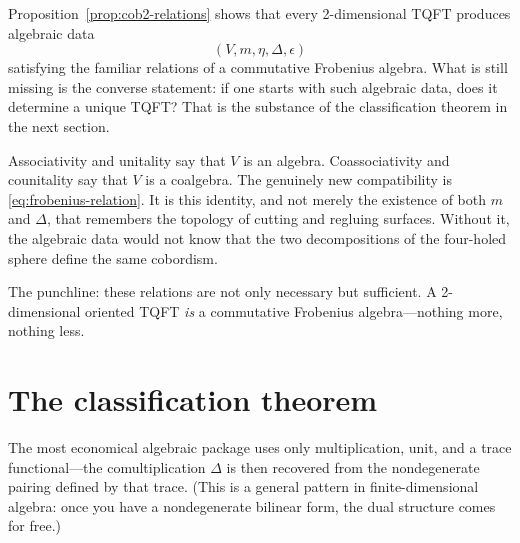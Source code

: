 \begin{remark}\label{rem:relations-not-yet-complete}
Proposition~\ref{prop:cob2-relations} shows that every 2-dimensional TQFT produces algebraic data
\begin{equation}\label{eq:frobenius-data-preview}
(V,m,\eta,\Delta,\epsilon)
\end{equation}
satisfying the familiar relations of a commutative Frobenius algebra. What is still missing is the converse statement: if one starts with such algebraic data, does it determine a unique TQFT? That is the substance of the classification theorem in the next section.
\end{remark}

\begin{remark}\label{rem:why-frobenius}
Associativity and unitality say that $V$ is an algebra. Coassociativity and counitality say that $V$ is a coalgebra. The genuinely new compatibility is \eqref{eq:frobenius-relation}. It is this identity, and not merely the existence of both $m$ and $\Delta$, that remembers the topology of cutting and regluing surfaces. Without it, the algebraic data would not know that the two decompositions of the four-holed sphere define the same cobordism.
\end{remark}

\medskip

\noindent The punchline: these relations are not only necessary but sufficient.  A 2-dimensional oriented TQFT \emph{is} a commutative Frobenius algebra---nothing more, nothing less.

\section{The classification theorem}\label{sec:frobenius-classification}

The most economical algebraic package uses only multiplication, unit, and a trace functional---the comultiplication $\Delta$ is then recovered from the nondegenerate pairing defined by that trace.  (This is a general pattern in finite-dimensional algebra: once you have a nondegenerate bilinear form, the dual structure comes for free.)

